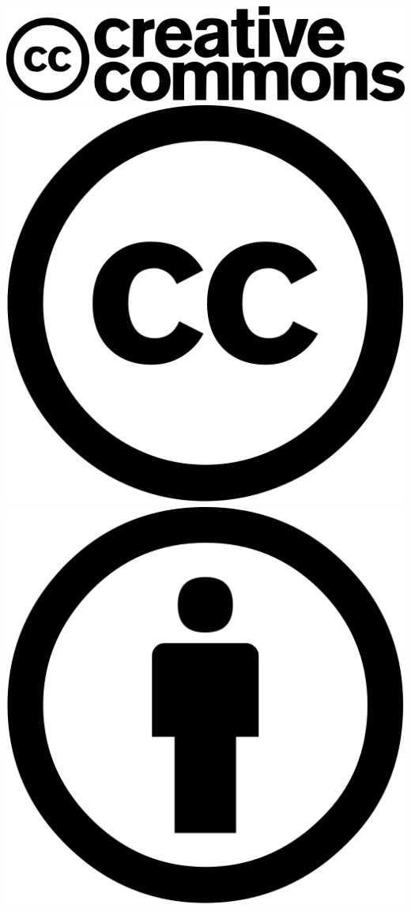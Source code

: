 \vspace*{0.75cm}
\begin{center}
\includegraphics[scale=0.3333]{./Images/Chapter00/creative-commons-logo.png}\quad
\includegraphics[scale=0.02]{./Images/Chapter00/cc-xlarge.png}
\includegraphics[scale=0.02]{./Images/Chapter00/by-xlarge.png}

\end{center}
